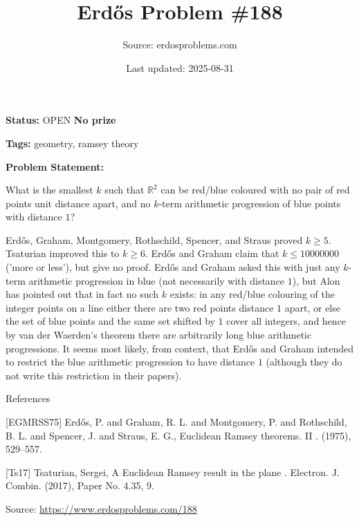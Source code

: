 \documentclass{article}
\title{Erd\H{o}s Problem \#188}
\date{Last updated: 2025-08-31}
\author{Source: erdosproblems.com}
\begin{document}
\maketitle

\noindent\textbf{Status:} OPEN \quad \textbf{No prize}

\noindent\textbf{Tags:} geometry, ramsey theory

\medskip

\noindent\textbf{Problem Statement:}

What is the smallest $k$ such that $\mathbb{R}^2$ can be red/blue coloured with no pair of red points unit distance apart, and no $k$-term arithmetic progression of blue points with distance $1$?




Erd\H{o}s, Graham, Montgomery, Rothschild, Spencer, and Straus \cite{EGMRSS75} proved $k\geq 5$. Tsaturian \cite{Ts17} improved this to $k\geq 6$. Erd\H{o}s and Graham claim that $k\leq 10000000$ ('more or less'), but give no proof. Erd\H{o}s and Graham asked this with just any $k$-term arithmetic progression in blue (not necessarily with distance $1$), but Alon has pointed out that in fact no such $k$ exists: in any red/blue colouring of the integer points on a line either there are two red points distance $1$ apart, or else the set of blue points and the same set shifted by $1$ cover all integers, and hence by van der Waerden's theorem there are arbitrarily long blue arithmetic progressions. It seems most likely, from context, that Erd\H{o}s and Graham intended to restrict the blue arithmetic progression to have distance $1$ (although they do not write this restriction in their papers).




References

[EGMRSS75] Erd\H{o}s, P. and Graham, R. L. and Montgomery, P. and Rothschild, B. L. and Spencer, J. and Straus, E. G., Euclidean {R}amsey theorems. {II} . (1975), 529--557.

[Ts17] Tsaturian, Sergei, A {E}uclidean {R}amsey result in the plane . Electron. J. Combin. (2017), Paper No. 4.35, 9.


\bigskip
\noindent\small{Source: \url{https://www.erdosproblems.com/188}}
\end{document}
